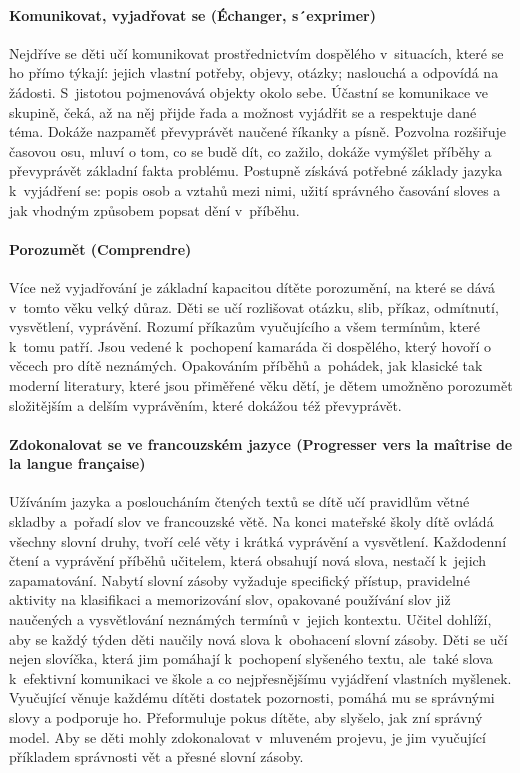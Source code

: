 			\paragraph{Komunikovat, vyjadřovat se (Échanger, s´exprimer)}

			Nejdříve se děti učí komunikovat prostřednictvím dospělého v situacích, které se ho přímo týkají: jejich vlastní potřeby, objevy, otázky; naslouchá a odpovídá na žádosti. S jistotou pojmenovává objekty okolo sebe. Účastní se komunikace ve skupině, čeká, až na něj přijde řada a možnost vyjádřit se a respektuje dané téma. Dokáže nazpaměť převyprávět naučené říkanky a písně. Pozvolna rozšiřuje časovou osu, mluví o tom, co se budě dít, co zažilo, dokáže vymýšlet příběhy a převyprávět základní fakta problému. Postupně získává potřebné základy jazyka k vyjádření se: popis osob a vztahů mezi nimi, užití správného časování sloves a jak vhodným způsobem popsat dění v příběhu.

			\paragraph{Porozumět (Comprendre)}
			Více než vyjadřování je základní kapacitou dítěte porozumění, na které se dává v tomto věku velký důraz.
			Děti se učí rozlišovat otázku, slib, příkaz, odmítnutí, vysvětlení, vyprávění. Rozumí příkazům vyučujícího a všem termínům, které k tomu patří. Jsou vedené k pochopení kamaráda či dospělého, který hovoří o věcech pro dítě neznámých. Opakováním příběhů a pohádek, jak klasické tak moderní literatury, které jsou přiměřené věku dětí, je dětem umožněno porozumět složitějším a delším vyprávěním, které dokážou též převyprávět. 

			\paragraph{Zdokonalovat se ve francouzském jazyce (Progresser vers la maîtrise de la langue française)}
			Užíváním jazyka a posloucháním čtených textů se dítě učí pravidlům větné skladby a pořadí slov ve francouzské větě. Na konci mateřské školy dítě ovládá všechny slovní druhy, tvoří celé věty i krátká vyprávění a vysvětlení. Každodenní čtení a vyprávění příběhů učitelem, která obsahují nová slova, nestačí k jejich zapamatování. Nabytí slovní zásoby vyžaduje specifický přístup, pravidelné aktivity na klasifikaci a memorizování slov, opakované používání slov již naučených a vysvětlování neznámých termínů v jejich kontextu. Učitel dohlíží, aby se každý týden děti naučily nová slova k obohacení slovní zásoby. Děti se učí nejen slovíčka, která jim pomáhají k pochopení slyšeného textu, ale také slova k efektivní komunikaci ve škole a co nejpřesnějšímu vyjádření vlastních myšlenek. Vyučující věnuje každému dítěti dostatek pozornosti, pomáhá mu se správnými slovy a podporuje ho. Přeformuluje pokus dítěte, aby slyšelo, jak zní správný model. Aby se děti mohly zdokonalovat v mluveném projevu, je jim vyučující příkladem správnosti vět a přesné slovní zásoby.

